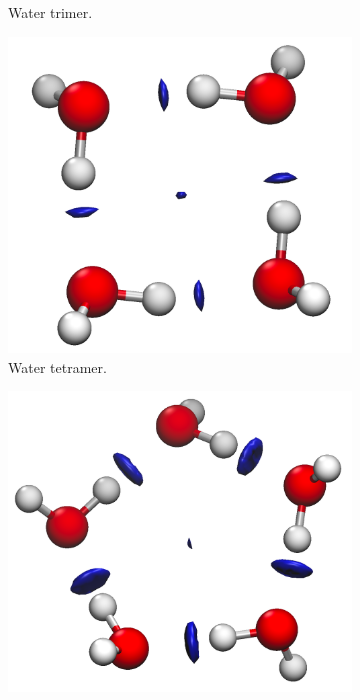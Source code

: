 \begin{figure}[h!]
\begin{subfigure}[b]{0.32\linewidth}
    \caption{Water trimer.}
  \end{subfigure}
  \begin{subfigure}[b]{0.32\linewidth}
    \includegraphics[width=\linewidth]{4/plots/nci/new/tetramerNCI}
    \caption{Water tetramer.}
  \end{subfigure}
  \begin{subfigure}[b]{0.4\linewidth}
    \includegraphics[width=\linewidth]{4/plots/nci/new/pentamer_cNCI}

\end{subfigure}
\end{figure}
